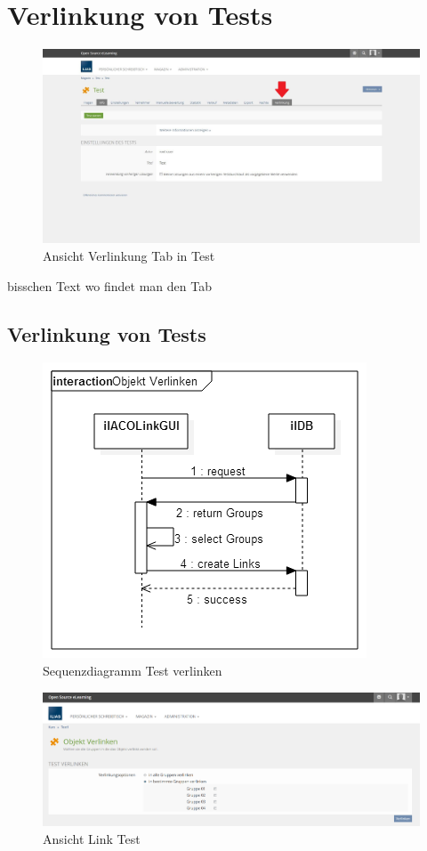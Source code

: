 \chapter{Verlinkung von Tests}\label{linkTest}
\begin{figure}[h!]
	\centering
	\includegraphics[width=1\textwidth]{img/Test.jpg}
	\caption{Ansicht Verlinkung Tab in Test}
\end{figure}

bisschen Text wo findet man den Tab
\newpage

\section{Verlinkung von Tests}

\begin{figure}[h!]
	\centering
	\includegraphics[width=.7\textwidth]{img/seq_linkGUI.png}
	\caption{Sequenzdiagramm Test verlinken}
\end{figure}
\begin{figure}[h!]
	\centering
	\includegraphics[width=1\textwidth]{img/linkTest.png}
	\caption{Ansicht Link Test}
\end{figure}

